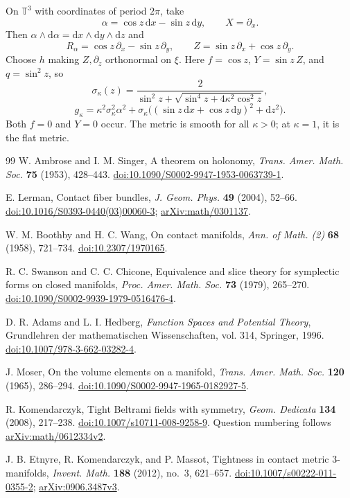 \documentclass[11pt,a4paper]{article}
\numberwithin{equation}{section}
\theoremstyle{definition}
\theoremstyle{remark}
\newcommand{\dd}{\mathrm d}
\begin{document}
On $\mathbb T^3$ with coordinates of period $2\pi$, take
\[
 \alpha=\cos z\,\dd x-\sin z\,\dd y,\qquad X=\partial_x.
\]
Then $\alpha\wedge\dd\alpha=\dd x\wedge\dd y\wedge\dd z$ and
\[
 R_\alpha=\cos z\,\partial_x-\sin z\,\partial_y,
 \qquad Z=\sin z\,\partial_x+\cos z\,\partial_y.
\]
Choose $h$ making $Z,\partial_z$ orthonormal on $\xi$.
Here $f=\cos z$, $Y=\sin z\,Z$, and $q=\sin^2z$, so
\[
 \sigma_\kappa(z)=\frac{2}{\sin^2z+
                    \sqrt{\sin^4z+4\kappa^2\cos^2z}},
\]
\[
 g_\kappa=\kappa^2\sigma_\kappa^2\alpha^2+
 \sigma_\kappa\bigl((\sin z\,\dd x+\cos z\,\dd y)^2+\dd z^2\bigr).
\]
Both $f=0$ and $Y=0$ occur. The metric is smooth for all $\kappa>0$;
at $\kappa=1$, it is the flat metric.

\begin{thebibliography}{99}
\small
\setlength{\itemsep}{2pt}
W. Ambrose and I. M. Singer, A theorem on holonomy,
\emph{Trans. Amer. Math. Soc.} \textbf{75} (1953), 428--443.
\href{https://doi.org/10.1090/S0002-9947-1953-0063739-1}{doi:10.1090/S0002-9947-1953-0063739-1}.

E. Lerman, Contact fiber bundles,
\emph{J. Geom. Phys.} \textbf{49} (2004), 52--66.
\href{https://doi.org/10.1016/S0393-0440(03)00060-3}{doi:10.1016/S0393-0440(03)00060-3};
\href{https://arxiv.org/abs/math/0301137}{arXiv:math/0301137}.

W. M. Boothby and H. C. Wang, On contact manifolds,
\emph{Ann. of Math. (2)} \textbf{68} (1958), 721--734.
\href{https://doi.org/10.2307/1970165}{doi:10.2307/1970165}.

R. C. Swanson and C. C. Chicone, Equivalence and slice theory for symplectic
forms on closed manifolds, \emph{Proc. Amer. Math. Soc.} \textbf{73}
(1979), 265--270.
\href{https://doi.org/10.1090/S0002-9939-1979-0516476-4}{doi:10.1090/S0002-9939-1979-0516476-4}.

D. R. Adams and L. I. Hedberg, \emph{Function Spaces and Potential Theory},
Grundlehren der mathematischen Wissenschaften, vol. 314, Springer, 1996.
\href{https://doi.org/10.1007/978-3-662-03282-4}{doi:10.1007/978-3-662-03282-4}.

J. Moser, On the volume elements on a manifold,
\emph{Trans. Amer. Math. Soc.} \textbf{120} (1965), 286--294.
\href{https://doi.org/10.1090/S0002-9947-1965-0182927-5}{doi:10.1090/S0002-9947-1965-0182927-5}.


R. Komendarczyk, Tight Beltrami fields with symmetry,
\emph{Geom. Dedicata} \textbf{134} (2008), 217--238.
\href{https://doi.org/10.1007/s10711-008-9258-9}{doi:10.1007/s10711-008-9258-9}.
Question numbering follows
\href{https://arxiv.org/abs/math/0612334v2}{arXiv:math/0612334v2}.

J. B. Etnyre, R. Komendarczyk, and P. Massot,
Tightness in contact metric 3-manifolds,
\emph{Invent. Math.} \textbf{188} (2012), no.~3, 621--657.
\href{https://doi.org/10.1007/s00222-011-0355-2}{doi:10.1007/s00222-011-0355-2};
\href{https://arxiv.org/abs/0906.3487v3}{arXiv:0906.3487v3}.
\end{thebibliography}
\end{document}
